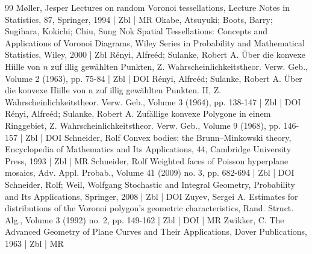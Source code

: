 \begin{thebibliography}{99}
Møller, Jesper Lectures on random Voronoi tessellations, Lecture Notes in Statistics, 87, Springer, 1994 | Zbl | MR
Okabe, Atsuyuki; Boots, Barry; Sugihara, Kokichi; Chiu, Sung Nok Spatial Tessellations: Concepts and Applications of Voronoi Diagrams, Wiley Series in Probability and Mathematical Statistics, Wiley, 2000 | Zbl
Rényi, Alfreéd; Sulanke, Robert A. Über die konvexe Hiille von $n$ zuf illig gewählten Punkten, Z. Wahrscheinlichkeitstheor. Verw. Geb., Volume 2 (1963), pp. 75-84 | Zbl | DOI
Rényi, Alfreéd; Sulanke, Robert A. Über die konvexe Hiille von n zuf illig gewählten Punkten. II, Z. Wahrscheinlichkeitstheor. Verw. Geb., Volume 3 (1964), pp. 138-147 | Zbl | DOI
Rényi, Alfreéd; Sulanke, Robert A. Zufällige konvexe Polygone in einem Ringgebiet, Z. Wahrscheinlichkeitstheor. Verw. Geb., Volume 9 (1968), pp. 146-157 | Zbl | DOI
Schneider, Rolf Convex bodies: the Brunn–Minkowski theory, Encyclopedia of Mathematics and Its Applications, 44, Cambridge University Press, 1993 | Zbl | MR
Schneider, Rolf Weighted faces of Poisson hyperplane mosaics, Adv. Appl. Probab., Volume 41 (2009) no. 3, pp. 682-694 | Zbl | DOI
Schneider, Rolf; Weil, Wolfgang Stochastic and Integral Geometry, Probability and Its Applications, Springer, 2008 | Zbl | DOI
Zuyev, Sergei A. Estimates for distributions of the Voronoi polygon’s geometric characteristics, Rand. Struct. Alg., Volume 3 (1992) no. 2, pp. 149-162 | Zbl | DOI | MR
Zwikker, C. The Advanced Geometry of Plane Curves and Their Applications, Dover Publications, 1963 | Zbl | MR
\end{thebibliography}
